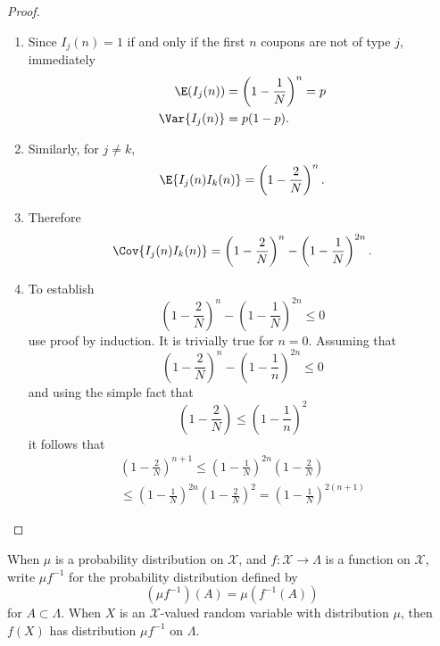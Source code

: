 \documentclass[12pt]{article}
\begin{document}
\begin{proof}
    \begin{enumerate}
        \item
            Since \( I_j(n) = 1 \) if and only if the first \( n \)
            coupons are not of type \( j \), immediately
            \begin{align*}
                \E(I_j(n) ) &= \left( 1 - \frac{1}{N} \right)^n = p \\
                \Var{I_j(n)} &= p (1- p).
            \end{align*}
        \item
            Similarly, for \( j \ne k \),
            \[
                \E{ I_j(n) I_k(n) } = \left( 1 - \frac{2}{N} \right)^n.
            \]
        \item
            Therefore
            \[
                \Cov{I_j(n) I_k(n)} = \left( 1 - \frac{2}{N} \right)^n -
                \left( 1 - \frac{1}{N} \right)^{2n}.
            \]
        \item
            To establish
            \[
                \left( 1 - \frac{2}{N} \right)^n - \left( 1 - \frac{1}{N}
                \right)^{2n} \le 0
            \] use proof by induction.  It is trivially true for \( n =
            0 \).  Assuming that
            \[
                \left( 1 - \frac{2}{N} \right)^n - \left( 1 - \frac{1}{n}
                \right)^{2n} \le 0
            \] and using the simple fact that
            \[
                \left( 1 - \frac{2}{N} \right) \le \left( 1 - \frac{1}{n}
                \right)^{2}
            \] it follows that
            \begin{multline*}
                \left( 1 - \frac{2}{N} \right)^{n+1} \le \left( 1 -
                \frac{1}{N} \right)^{2n} \left( 1 - \frac{2}{N} \right)
                \\
                \le \left( 1 - \frac{1}{N} \right)^{2n} \left( 1 - \frac
                {2}{N} \right)^2 = \left( 1 - \frac{1}{N} \right)^{2(n+1)}
            \end{multline*}
    \end{enumerate}
\end{proof}

\begin{definition}
    When \( \mu \) is a probability distribution on \( \mathcal{X} \),
    and \( f :  \mathcal{X} \to \Lambda \) is a function on \( \mathcal{X}
    \), write \( \mu f^{-1} \) for the probability distribution defined
    by
    \[
        (\mu f^{-1})(A) = \mu(f^{-1}(A))
    \] for \( A \subset \Lambda \).  When \( X \) is an \( \mathcal{X} \)-valued
    random variable with distribution \( \mu \), then \( f(X) \) has
    distribution \( \mu f^{-1} \) on \( \Lambda \).
\end{definition}
\end{document}
